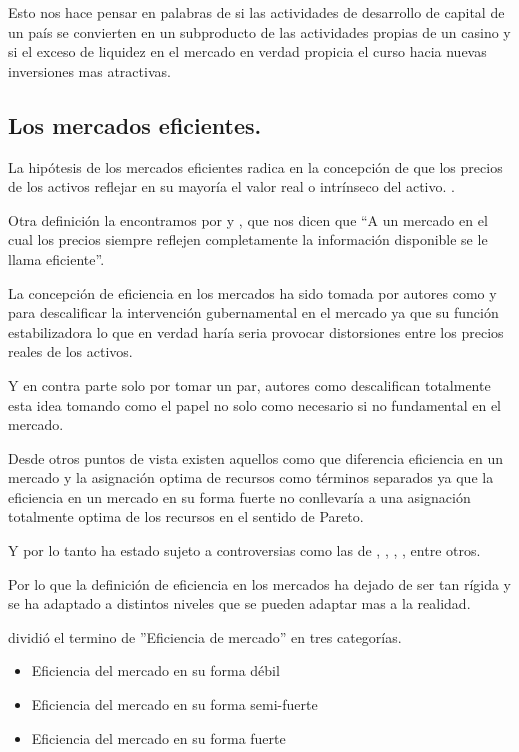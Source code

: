 \documentclass[letterpaper,12pt,oneside]{book}
\begin{document}
Esto nos hace pensar en palabras de \cite{a12} si las actividades de desarrollo de capital de un país se convierten en un subproducto de las actividades propias de un casino y si el exceso de liquidez en el mercado en verdad propicia el curso hacia nuevas inversiones mas atractivas. 



\subsection{Los mercados eficientes.}
La hipótesis de los mercados eficientes radica en la concepción de que los precios de los activos reflejar en su mayoría el valor real o intrínseco del activo. \cite{a0}.

Otra definición la encontramos por \cite{a1} y \cite{a2},
que nos dicen que “A un mercado en el cual los precios siempre reflejen completamente la información disponible se le llama eficiente”.


La concepción de eficiencia en los mercados ha sido tomada por autores como \cite{a5} y \cite{a4} para descalificar la intervención gubernamental en el mercado ya que su función estabilizadora lo que en verdad haría seria provocar distorsiones entre los precios reales de los activos.

Y en contra parte solo por tomar un par, autores como \cite{a6} descalifican totalmente esta idea tomando como el papel no solo como necesario si no fundamental en el mercado.


Desde otros puntos de vista existen aquellos como \cite{a7} que diferencia eficiencia en un mercado y la asignación optima de recursos como términos separados ya que la eficiencia en un mercado en su forma fuerte no conllevaría a una asignación totalmente optima de los recursos en el sentido de Pareto.



Y por lo tanto ha estado sujeto a controversias como las de \cite{a1}, \cite{a8}, \cite{a4}, \cite{a9}, entre otros.

Por lo que la definición de eficiencia en los mercados ha dejado de ser tan rígida y se ha adaptado a distintos niveles que se pueden adaptar mas a la realidad.

\cite{a2} dividió el termino de ''Eficiencia de mercado'' en tres categorías.

\begin{itemize}

\item Eficiencia del mercado en su forma débil

\item Eficiencia del mercado en su forma semi-fuerte

\item Eficiencia del mercado en su forma fuerte 

\end{itemize}
\end{document}
